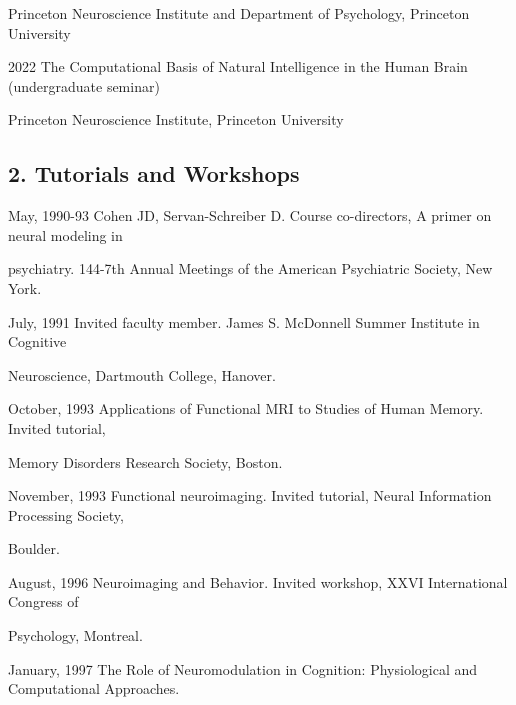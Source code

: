 \documentclass[10 pt]{article}
\begin{document}
\hspace{0.81in} Princeton Neuroscience Institute and Department of Psychology, Princeton University
    \smallskip

2022 \hspace{0.51in} The Computational Basis of Natural Intelligence in the Human Brain (undergraduate seminar)

\hspace{0.81in} Princeton Neuroscience Institute, Princeton University
    \smallskip

\subsection*{2. Tutorials and Workshops} \label{secTEACHING2}
    \medskip

May, 1990-93 \hspace{0.25in} Cohen JD, Servan-Schreiber D. Course co-directors, A primer on neural modeling in

\hspace{1.1in} psychiatry. 144-7th Annual Meetings of the American Psychiatric Society, New York.

July, 1991 \hspace{0.44in} Invited faculty member. James S. McDonnell Summer Institute in Cognitive

\hspace{1.1in} Neuroscience, Dartmouth College, Hanover.

October, 1993 \hspace{0.2in} Applications of Functional MRI to Studies of Human Memory. Invited tutorial,

\hspace{1.1in} Memory Disorders Research Society, Boston.

November, 1993 \hspace{0.09in} Functional neuroimaging. Invited tutorial, Neural Information Processing Society,

\hspace{1.1in} Boulder.

August, 1996 \hspace{0.25in} Neuroimaging and Behavior. Invited workshop, XXVI International Congress of

\hspace{1.1in} Psychology, Montreal.

January, 1997 \hspace{0.23in} The Role of Neuromodulation in Cognition: Physiological and Computational Approaches.
\end{document}
